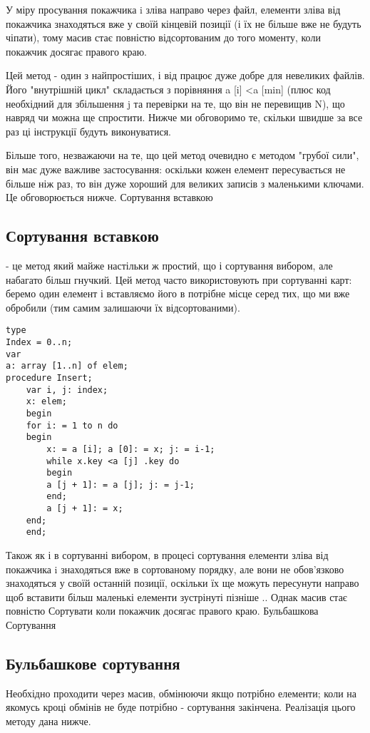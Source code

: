 У міру просування покажчика i зліва направо через файл, елементи зліва від покажчика знаходяться вже у своїй кінцевій позиції (і їх не більше вже не будуть чіпати), тому масив стає повністю відсортованим до того моменту, коли покажчик досягає правого краю.

Цей метод - один з найпростіших, і від працює дуже добре для невеликих файлів. Його "внутрішній цикл" складається з порівняння a [i] <a [min] (плюс код необхідний для збільшення j та перевірки на те, що він не перевищив N), що навряд чи можна ще спростити. Нижче ми обговоримо те, скільки швидше за все раз ці інструкції будуть виконуватися.

Більше того, незважаючи на те, що цей метод очевидно є методом "грубої сили", він має дуже важливе застосування: оскільки кожен елемент пересувається не більше ніж раз, то він дуже хороший для великих записів з маленькими ключами. Це обговорюється нижче.
Сортування вставкою


\subsection{Сортування вставкою}
 - це метод який майже настільки ж простий, що і сортування вибором, але набагато більш гнучкий. Цей метод часто використовують при сортуванні карт: беремо один елемент і вставляємо його в потрібне місце серед тих, що ми вже обробили (тим самим залишаючи їх відсортованими).

\begin{lstlisting}[label=code:vstav,caption=Сортування вставкою]
type
Index = 0..n;
var
a: array [1..n] of elem;
procedure Insert;
    var i, j: index;
    x: elem;
    begin
    for i: = 1 to n do
    begin
        x: = a [i]; a [0]: = x; j: = i-1;
        while x.key <a [j] .key do
        begin
        a [j + 1]: = a [j]; j: = j-1;
        end;
        a [j + 1]: = x;
    end;
    end;
\end{lstlisting}
Також як і в сортуванні вибором, в процесі сортування елементи зліва від покажчика i знаходяться вже в сортованому порядку, але вони не обов'язково знаходяться у своїй останній позиції, оскільки їх ще можуть пересунути направо щоб вставити більш маленькі елементи зустрінуті пізніше .. Однак масив стає повністю Сортувати коли покажчик досягає правого краю.
Бульбашкова Сортування

\subsection{Бульбашкове сортування} 
Необхідно проходити через масив, обмінюючи якщо потрібно елементи; коли на якомусь кроці обмінів не буде потрібно - сортування закінчена. Реалізація цього методу дана нижче.

